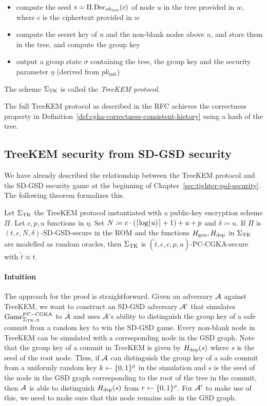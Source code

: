 \begin{definition}
\begin{itemize}
\begin{itemize}
			      \item compute the seed $s = \Pi.\mathrm{Dec}_{sk_{\mathrm{init}}}(c)$ of node $u$ in the tree provided in $w$, where $c$ is the ciphertext provided in $w$
			      \item compute the secret key of $u$ and the non-blank nodes above $u$, and store them in the tree, and compute the group key
			      \item output a group state $\sigma$ containing the tree, the group key and the security parameter $\eta$ (derived from $pk_{\mathrm{init}}$)
		      \end{itemize}
	\end{itemize}
	The scheme $\Sigma_{\mathrm{TK}}$ is called the \emph{TreeKEM protocol}.
\end{definition}

The full TreeKEM protocol as described in the RFC achieves the correctness property in Definition~\ref{def:cgka-correctness-consistent-history} using a hash of the tree.

\subsection{TreeKEM security from SD-GSD security}

We have already described the relationship between the TreeKEM protocol and the SD-GSD security game at the beginning of Chapter~\ref{sec:tighter-gsd-security}. The following theorem formalizes this.

\begin{theorem} \label{theorem:cgka-from-sdgsd}
	Let $\Sigma_{\mathrm{TK}}$ the TreeKEM protocol instantiated with a public-key encryption scheme $\Pi$. Let $c, p, u$ functions in $\eta$. Set $N \coloneqq c \cdot (\lceil\log(u)\rceil + 1) + u + p$ and $\delta \coloneqq u$. If $\Pi$ is $(t, \epsilon, N, \delta)$-SD-GSD-secure in the ROM and the functions $H_\mathrm{gen}, H_\mathrm{dep}$ in $\Sigma_{\mathrm{TK}}$ are modelled as random oracles, then $\Sigma_{\mathrm{TK}}$ is $(\tilde{t}, \epsilon, c, p, u)$-PC-CGKA-secure with $\tilde{t} \approx t$.
\end{theorem}

\paragraph{Intuition} The approach for the proof is straightforward. Given an adversary $\mathcal{A}$ against TreeKEM, we want to construct an SD-GSD adversary $\mathcal{A}'$ that simulates $\mathrm{Game}_{\Sigma_{\mathrm{TK}}, \eta}^{\mathrm{PC-CGKA}}$ to $\mathcal{A}$ and uses $\mathcal{A}$'s ability to distinguish the group key of a safe commit from a random key to win the SD-GSD game. Every non-blank node in TreeKEM can be simulated with a corresponding node in the GSD graph. Note that the group key of a commit in TreeKEM is given by $H_\mathrm{dep}(s)$ where $s$ is the seed of the root node. Thus, if $\mathcal{A}$ can distinguish the group key of a safe commit from a uniformly random key $k \leftarrow \{0, 1\}^\rho$ in the simulation and $s$ is the seed of the node in the GSD graph corresponding to the root of the tree in the commit, then $\mathcal{A}$ is able to distinguish $H_\mathrm{dep}(s)$ from $r \leftarrow \{0, 1\}^\rho$. For $\mathcal{A}'$ to make use of this, we need to make sure that this node remains safe in the GSD graph.


